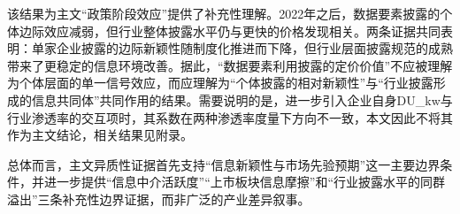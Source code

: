 该结果为主文``政策阶段效应''提供了补充性理解。2022年之后，数据要素披露的个体边际效应减弱，但行业整体披露水平仍与更快的价格发现相关。两条证据共同表明：单家企业披露的边际新颖性随制度化推进而下降，但行业层面披露规范的成熟带来了更稳定的信息环境改善。据此，``数据要素利用披露的定价价值''不应被理解为个体层面的单一信号效应，而应理解为``个体披露的相对新颖性''与``行业披露形成的信息共同体''共同作用的结果。需要说明的是，进一步引入企业自身DU\_kw与行业渗透率的交互项时，其系数在两种渗透率度量下方向不一致，本文因此不将其作为主文结论，相关结果见附录。

总体而言，主文异质性证据首先支持``信息新颖性与市场先验预期''这一主要边界条件，并进一步提供``信息中介活跃度''``上市板块信息摩擦''和``行业披露水平的同群溢出''三条补充性边界证据，而非广泛的产业差异叙事。
